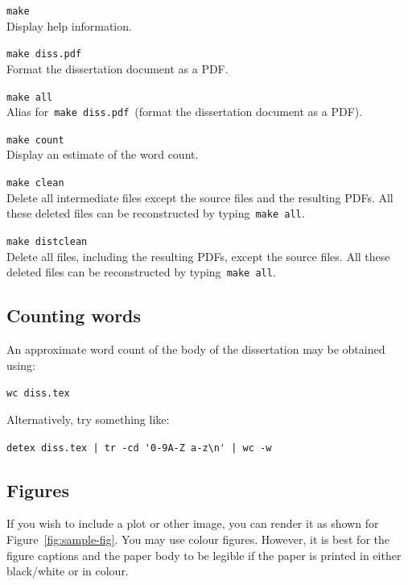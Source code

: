 \documentclass[12pt,a4paper]{article}
\begin{document}
\begin{description}
    \item\texttt{make} \\
    Display help information.
    
    \item\texttt{make diss.pdf} \\
    Format the dissertation document as a PDF.
    
    \item\texttt{make all} \\
    Alias for \,\texttt{make diss.pdf} \,(format the dissertation document as a PDF).
    
    \item\texttt{make count} \\
    Display an estimate of the word count.
    
    \item\texttt{make clean} \\ 
    Delete all intermediate files except the source files and the resulting PDFs. 
    All these deleted files can be reconstructed by typing \,\texttt{make all}.
    
    \item\texttt{make distclean} \\ 
    Delete all files, including the resulting PDFs, except the source files. 
    All these deleted files can be reconstructed by typing \,\texttt{make all}.
\end{description}

\subsection{Counting words}

An approximate word count of the body of the dissertation may be obtained using:

\texttt{wc diss.tex}

\noindent
Alternatively, try something like:

\verb/detex diss.tex | tr -cd '0-9A-Z a-z\n' | wc -w/

\subsection{Figures}

If you wish to include a plot or other image, you can render it as shown for
Figure~\ref{fig:sample-fig}. You may use colour figures. However, it is best for
the figure captions and the paper body to be legible if the paper is printed in
either black/white or in colour.
\end{document}

